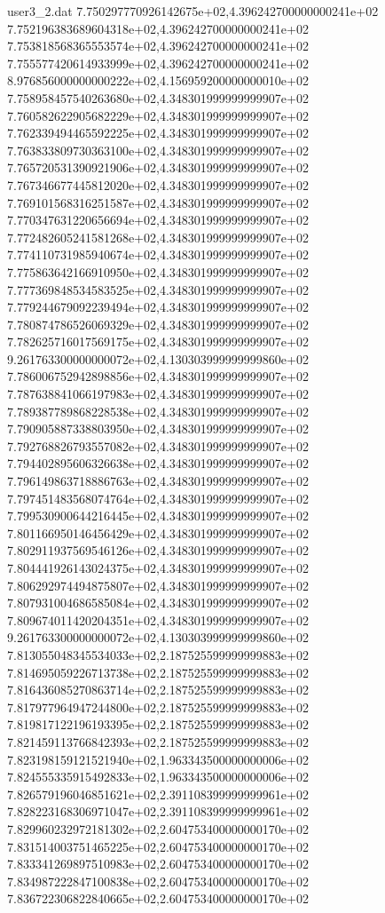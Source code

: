 \begin{filecontents}{user3_2.dat}
7.750297770926142675e+02,4.396242700000000241e+02
7.752196383689604318e+02,4.396242700000000241e+02
7.753818568365553574e+02,4.396242700000000241e+02
7.755577420614933999e+02,4.396242700000000241e+02
8.976856000000000222e+02,4.156959200000000010e+02
7.758958457540263680e+02,4.348301999999999907e+02
7.760582622905682229e+02,4.348301999999999907e+02
7.762339494465592225e+02,4.348301999999999907e+02
7.763833809730363100e+02,4.348301999999999907e+02
7.765720531390921906e+02,4.348301999999999907e+02
7.767346677445812020e+02,4.348301999999999907e+02
7.769101568316251587e+02,4.348301999999999907e+02
7.770347631220656694e+02,4.348301999999999907e+02
7.772482605241581268e+02,4.348301999999999907e+02
7.774110731985940674e+02,4.348301999999999907e+02
7.775863642166910950e+02,4.348301999999999907e+02
7.777369848534583525e+02,4.348301999999999907e+02
7.779244679092239494e+02,4.348301999999999907e+02
7.780874786526069329e+02,4.348301999999999907e+02
7.782625716017569175e+02,4.348301999999999907e+02
9.261763300000000072e+02,4.130303999999999860e+02
7.786006752942898856e+02,4.348301999999999907e+02
7.787638841066197983e+02,4.348301999999999907e+02
7.789387789868228538e+02,4.348301999999999907e+02
7.790905887338803950e+02,4.348301999999999907e+02
7.792768826793557082e+02,4.348301999999999907e+02
7.794402895606326638e+02,4.348301999999999907e+02
7.796149863718886763e+02,4.348301999999999907e+02
7.797451483568074764e+02,4.348301999999999907e+02
7.799530900644216445e+02,4.348301999999999907e+02
7.801166950146456429e+02,4.348301999999999907e+02
7.802911937569546126e+02,4.348301999999999907e+02
7.804441926143024375e+02,4.348301999999999907e+02
7.806292974494875807e+02,4.348301999999999907e+02
7.807931004686585084e+02,4.348301999999999907e+02
7.809674011420204351e+02,4.348301999999999907e+02
9.261763300000000072e+02,4.130303999999999860e+02
7.813055048345534033e+02,2.187525599999999883e+02
7.814695059226713738e+02,2.187525599999999883e+02
7.816436085270863714e+02,2.187525599999999883e+02
7.817977964947244800e+02,2.187525599999999883e+02
7.819817122196193395e+02,2.187525599999999883e+02
7.821459113766842393e+02,2.187525599999999883e+02
7.823198159121521940e+02,1.963343500000000006e+02
7.824555335915492833e+02,1.963343500000000006e+02
7.826579196046851621e+02,2.391108399999999961e+02
7.828223168306971047e+02,2.391108399999999961e+02
7.829960232972181302e+02,2.604753400000000170e+02
7.831514003751465225e+02,2.604753400000000170e+02
7.833341269897510983e+02,2.604753400000000170e+02
7.834987222847100838e+02,2.604753400000000170e+02
7.836722306822840665e+02,2.604753400000000170e+02

\end{filecontents}
